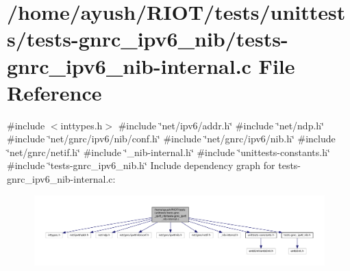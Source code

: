 \hypertarget{tests-gnrc__ipv6__nib-internal_8c}{}\section{/home/ayush/\+R\+I\+O\+T/tests/unittests/tests-\/gnrc\+\_\+ipv6\+\_\+nib/tests-\/gnrc\+\_\+ipv6\+\_\+nib-\/internal.c File Reference}
\label{tests-gnrc__ipv6__nib-internal_8c}
{\ttfamily \#include $<$inttypes.\+h$>$}\newline
{\ttfamily \#include \char`\"{}net/ipv6/addr.\+h\char`\"{}}\newline
{\ttfamily \#include \char`\"{}net/ndp.\+h\char`\"{}}\newline
{\ttfamily \#include \char`\"{}net/gnrc/ipv6/nib/conf.\+h\char`\"{}}\newline
{\ttfamily \#include \char`\"{}net/gnrc/ipv6/nib.\+h\char`\"{}}\newline
{\ttfamily \#include \char`\"{}net/gnrc/netif.\+h\char`\"{}}\newline
{\ttfamily \#include \char`\"{}\+\_\+nib-\/internal.\+h\char`\"{}}\newline
{\ttfamily \#include \char`\"{}unittests-\/constants.\+h\char`\"{}}\newline
{\ttfamily \#include \char`\"{}tests-\/gnrc\+\_\+ipv6\+\_\+nib.\+h\char`\"{}}\newline
Include dependency graph for tests-\/gnrc\+\_\+ipv6\+\_\+nib-\/internal.c\+:
\nopagebreak
\begin{figure}[H]
\begin{center}
\leavevmode
\includegraphics[width=350pt]{tests-gnrc__ipv6__nib-internal_8c__incl}
\end{center}
\end{figure}
